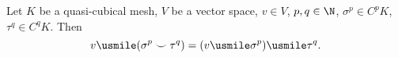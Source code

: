 \begin{proposition}
  Let
    $K$ be a quasi-cubical mesh,
    $V$ be a vector space, $v \in V$,
    $p, q \in \N$,
    $\sigma^p \in C^p K$,
    $\tau^q \in C^q K$.
  Then
  \begin{equation}
    v \usmile (\sigma^p \smile \tau^q) = (v \usmile \sigma^p) \usmile \tau^q.
  \end{equation}
\end{proposition}
